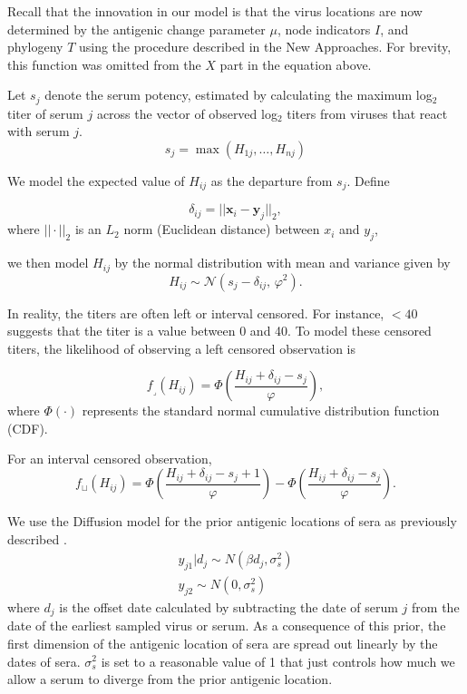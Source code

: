 \documentclass[11pt,oneside,letterpaper]{article}
\newcommand{\virus}{\mathbf{x}}						%
\newcommand{\serum}{\mathbf{y}}						%
\newcommand{\se}{s}									%
\newcommand{\threshold}{f_{\textstyle \lrcorner}}	%
\newcommand{\interval}{f_{\sqcup}}					%
\newcommand{\mdssd}{\varphi}						%
\newcommand{\vn}{n}									%
\newcommand{\normal}{\mathcal{N}}					%
\begin{document}
Recall that the innovation in our model is that the virus locations are now determined by the antigenic change parameter $\mu$, node indicators $I$, and phylogeny $T$ using the procedure described in the New Approaches. 
For brevity, this function was omitted from the $X$ part in the equation above.

Let $s_j$ denote the serum potency, estimated by calculating the maximum log$_2$ titer of serum $j$ across the vector of observed log$_2$ titers from viruses that react with serum $j$.
\begin{equation}
	\se_j = \max ( H_{1j},\ldots,H_{\vn j} )
\end{equation}

We model the expected value of $H_{ij}$ as the departure from $\se_j$. Define

\begin{equation}
	\delta_{ij} =  || \virus_i - \serum_j ||_2,
\end{equation}
where $|| \cdot ||_2$ is an $L_2$ norm (Euclidean distance) between $x_i$ and $y_j$,

we then model $H_{ij}$ by the normal distribution with mean and variance given by 
\begin{equation} \label{hij}
	H_{ij} \sim \normal( \se_j - \delta_{ij}, \, \mdssd^2 ).
\end{equation}


 In reality, the titers are often left or interval censored. For instance, $<40$ suggests that the titer is a value between 0 and 40. To model these censored titers, the likelihood of observing a left censored observation is 

\begin{equation} 
	\threshold(H_{ij}) = \Phi \left( \frac{ H_{ij} + \delta_{ij} - \se_j }{ \mdssd } \right),
\end{equation}
where $\Phi(\cdot)$ represents the standard normal cumulative distribution function (CDF).

For an interval censored observation,
\begin{equation} 
	\interval(H_{ij}) = \Phi \left( \frac{ H_{ij} + \delta_{ij} - \se_j + 1 }{ \mdssd } \right) - \Phi \left( \frac{ H_{ij} + \delta_{ij} - \se_j }{\mdssd} \right).
\end{equation}



We use the Diffusion model for the prior antigenic locations of sera as previously described \cite{bedford_integrating_2014}. 
\begin{eqnarray}
	y_{j1} | d_j \sim N ( \beta d_j, \sigma^2_s )  \\
	y_{j2}  \sim N(0, \sigma^2_s)
\end{eqnarray}
where $d_j$ is the offset date calculated by subtracting the date of serum $j$ from the date of the earliest sampled virus or serum. 
As a consequence of this prior, the first dimension of the antigenic location of sera are spread out linearly by the dates of sera. 
$\sigma^2_s$ is set to a reasonable value of 1 that just controls how much we allow a serum to diverge from the prior antigenic location.
\end{document}
